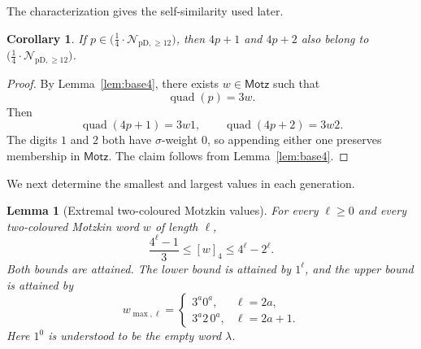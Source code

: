 \documentclass[12pt]{article}
\theoremstyle{plain}
\newtheorem{lemma}[theorem]{Lemma}
\newtheorem{corollary}[theorem]{Corollary}
\theoremstyle{definition}
\theoremstyle{plain}
\newcommand{\Pset}{%
  \bigl(\tfrac{1}{4}\cdot\mathcal{N}_{\mathrm{pD},\geq 12}\bigr)%
}
\begin{document}
The characterization gives the self-similarity used later.

\begin{corollary}\label{cor:Pclosure}
If $p\in\Pset$, then $4p+1$ and $4p+2$ also belong to $\Pset$.
\end{corollary}

\begin{proof}
By Lemma~\ref{lem:base4}, there exists $w\in\mathsf{Motz}$ such that
\[
 \operatorname{quad}(p)=3w.
\]
Then
\[
 \operatorname{quad}(4p+1)=3w1,
 \qquad
 \operatorname{quad}(4p+2)=3w2.
\]
The digits $1$ and $2$ both have $\sigma$-weight $0$, so appending either one
preserves membership in $\mathsf{Motz}$.  The claim follows from
Lemma~\ref{lem:base4}.
\end{proof}

We next determine the smallest and largest values in each generation.

\begin{lemma}[Extremal two-coloured Motzkin values]\label{lem:extremal}
For every $\ell\geq0$ and every two-coloured Motzkin word $w$ of length $\ell$,
\begin{equation}\label{eq:motzkin-extrema}
  \frac{4^{\ell}-1}{3}\leq[w]_4\leq4^{\ell}-2^{\ell}.
\end{equation}
Both bounds are attained.  The lower bound is attained by $1^{\ell}$, and the
upper bound is attained by
\[
  w_{\max,\ell}=
  \begin{cases}
    3^a0^a,&\ell=2a,\\
    3^a2\,0^a,&\ell=2a+1.
  \end{cases}
\]
Here $1^0$ is understood to be the empty word $\lambda$.
\end{lemma}
\end{document}
